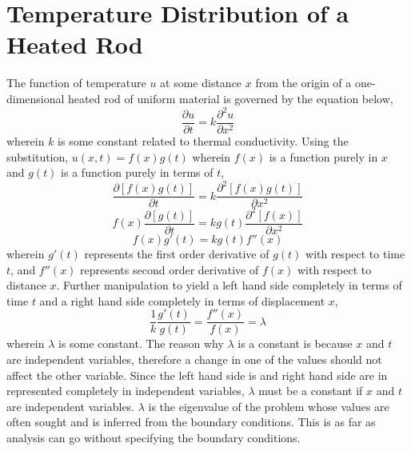 \chapter{Temperature Distribution of a Heated Rod}
\begin{comment} 
Physics Archives
Havent inserted Sturm Liouville orthonormal basis functions
\end{comment}
The function of temperature $u$ at some distance $x$ from the origin of a one-dimensional heated rod of uniform material is governed by the equation below,
$$\frac{\partial u}{\partial t} = k\frac{\partial^2 u}{\partial x^2}$$
wherein $k$ is some constant related to thermal conductivity. Using the substitution, $u(x,t) = f(x)g(t)$ wherein $f(x)$ is a function purely in $x$ and $g(t)$ is a function purely in terms of $t$,
$$\frac{\partial [f(x)g(t)]}{\partial t} = k\frac{\partial^2 [f(x)g(t)]}{\partial x^2}$$
$$f(x)\frac{\partial [g(t)]}{\partial t} = kg(t)\frac{\partial^2 [f(x)]}{\partial x^2}$$
$$f(x)g'(t) = kg(t)f''(x)$$wherein $g'(t)$ represents the first order derivative of $g(t)$ with respect to time $t$, and $f''(x)$ represents second order derivative of $f(x)$ with respect to distance $x$. Further manipulation to yield a left hand side completely in terms of time $t$ and a right hand side completely in terms of displacement $x$,
$$\frac{1}{k}\frac{g'(t)}{g(t)} = \frac{f''(x)}{f(x)} = \lambda$$wherein $\lambda$ is some constant. The reason why $\lambda$ is a constant is because $x$ and $t$ are independent variables, therefore a change in one of the values should not affect the other variable. Since the left hand side is and right hand side are in represented completely in independent variables, $\lambda$ must be a constant if $x$ and $t$ are independent variables. $\lambda$ is the eigenvalue of the problem whose values are often sought and is inferred from the boundary conditions. This is as far as analysis can go without specifying the boundary conditions.

